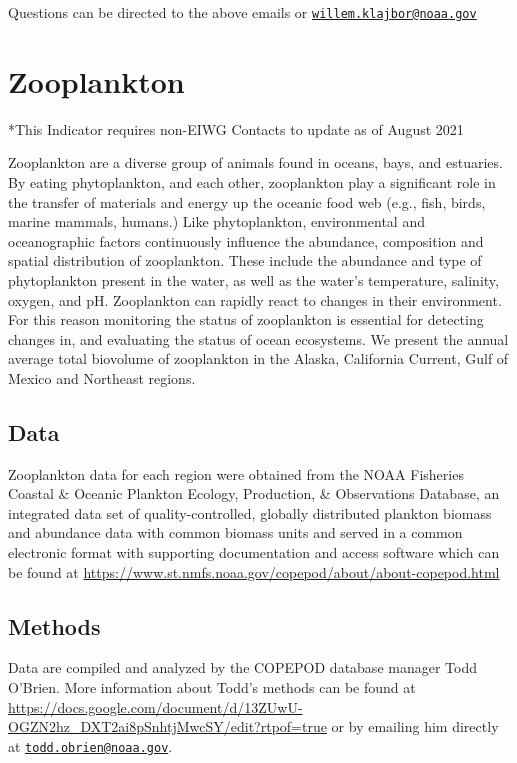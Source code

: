 \documentclass[
]{book}
\begin{document}
Questions can be directed to the above emails or \href{mailto:willem.klajbor@noaa.gov}{\nolinkurl{willem.klajbor@noaa.gov}}

\hypertarget{zooplankton}{%
\chapter{Zooplankton}\label{zooplankton}}

*This Indicator requires non-EIWG Contacts to update as of August 2021

Zooplankton are a diverse group of animals found in oceans, bays, and estuaries. By eating phytoplankton, and each other, zooplankton play a significant role in the transfer of materials and energy up the oceanic food web (e.g., fish, birds, marine mammals, humans.) Like phytoplankton, environmental and oceanographic factors continuously influence the abundance, composition and spatial distribution of zooplankton. These include the abundance and type of phytoplankton present in the water, as well as the water's temperature, salinity, oxygen, and pH. Zooplankton can rapidly react to changes in their environment. For this reason monitoring the status of zooplankton is essential for detecting changes in, and evaluating the status of ocean ecosystems. We present the annual average total biovolume of zooplankton in the Alaska, California Current, Gulf of Mexico and Northeast regions.

\hypertarget{data}{%
\section{Data}\label{data}}

Zooplankton data for each region were obtained from the NOAA Fisheries Coastal \& Oceanic Plankton Ecology, Production, \& Observations Database, an integrated data set of quality-controlled, globally distributed plankton biomass and abundance data with common biomass units and served in a common electronic format with supporting documentation and access software which can be found at \url{https://www.st.nmfs.noaa.gov/copepod/about/about-copepod.html}

\hypertarget{methods}{%
\section{Methods}\label{methods}}

Data are compiled and analyzed by the COPEPOD database manager Todd O'Brien. More information about Todd's methods can be found at \url{https://docs.google.com/document/d/13ZUwU-OGZN2hz_DXT2ai8pSnhtjMwcSY/edit?rtpof=true} or by emailing him directly at \href{mailto:todd.obrien@noaa.gov}{\nolinkurl{todd.obrien@noaa.gov}}.
\end{document}
